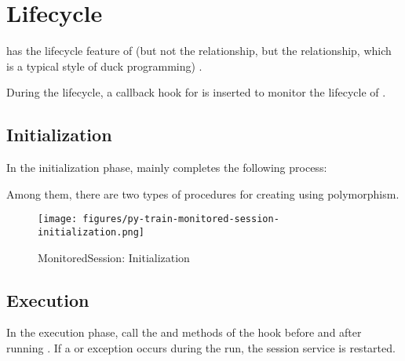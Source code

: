 \section{Lifecycle}
\begin{content}
 has the lifecycle feature of  (but not the  relationship, but the  relationship, which is a typical style of duck programming) .

During the lifecycle, a callback hook for  is inserted to monitor the lifecycle of .


\subsection{Initialization}
In the initialization phase,  mainly completes the following process:

\begin{enum}
\end{enum}

Among them, there are two types of procedures for creating  using  polymorphism.

\begin{enum}
\end{enum}

\begin{figure}[!htbp]
  \centering
  \texttt{[image: figures/py-train-monitored-session-initialization.png]}
  \caption{MonitoredSession: Initialization}
  \label{fig:py-train-monitored-session-initialization}
\end{figure}


\subsection{Execution}
In the execution phase, call the  and  methods of the hook before and after running . If a  or  exception occurs during the run, the session service is restarted.


\end{content}
